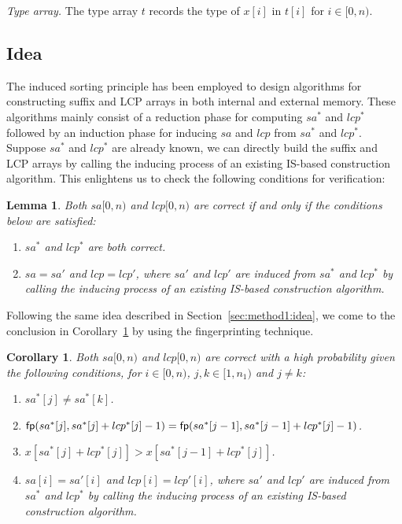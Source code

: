 \documentclass[10pt,journal,compsoc]{IEEEtran}
\newtheorem{Lemma}{Lemma}
\newtheorem{Corollary}{Corollary}
\begin{document}
{\em Type array.} The type array $t$ records the type of $x[i]$ in $t[i]$ for $i \in [0, n)$.

\subsection{Idea} \label{sec:method2:idea}

The induced sorting principle has been employed to design algorithms for constructing suffix and LCP arrays in both internal and external memory. These algorithms mainly consist of a reduction phase for computing $sa^*$ and $lcp^*$ followed by an induction phase for inducing $sa$ and $lcp$ from $sa^*$ and $lcp^*$. Suppose $sa^*$ and $lcp^*$ are already known, we can directly build the suffix and LCP arrays by calling the inducing process of an existing IS-based construction algorithm. This enlightens us to check the following conditions for verification:
	
\begin{Lemma} \label{lemma:2}
Both $sa[0, n)$ and $lcp[0, n)$ are correct if and only if the conditions below are satisfied:

\begin{enumerate}[(1)]
	\item
	$sa^*$ and $lcp^*$ are both correct.
	\item
	$sa = sa'$ and $lcp = lcp'$, where $sa'$ and $lcp'$ are induced from $sa^*$ and $lcp^*$ by calling the inducing process of an existing IS-based construction algorithm.
\end{enumerate}
\end{Lemma}

Following the same idea described in Section~\ref{sec:method1:idea}, we come to the conclusion in Corollary~\ref{corollary:2} by using the fingerprinting technique.

\begin{Corollary} \label{corollary:2}
Both $sa[0, n)$ and $lcp[0, n)$ are correct with a high probability given the following conditions, for $i \in [0, n)$, $j, k \in [1, n_1)$ and $j \ne k$:
	
\begin{enumerate}[(1)]
	\item 
	$sa^*[j] \ne sa^*[k]$. 
	\item
	${\sf fp}(sa^*[j], sa^*[j] + lcp^*[j] - 1) = {\sf fp}(sa^*[j - 1], sa^*[j - 1] + lcp^*[j] - 1)$.
	\item
	$x[sa^*[j] + lcp^*[j]] > x[sa^*[j - 1] + lcp^*[j]]$.
	\item 
	$sa[i] = sa'[i]$ and $lcp[i] = lcp'[i]$, where $sa'$ and $lcp'$ are induced from $sa^*$ and $lcp^*$ by calling the inducing process of an existing IS-based construction algorithm.
\end{enumerate}

\end{Corollary}
\end{document}
